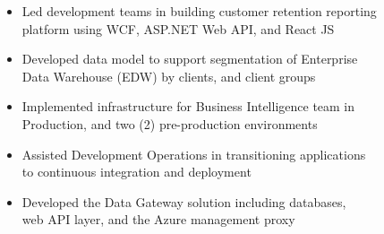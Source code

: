 
%


\ExperienceExpanded
{\begin{itemize}
     \item Led development teams in building customer retention reporting
     \\ platform using WCF, ASP.NET Web API, and React JS
     \item Developed data model to support segmentation of Enterprise
     \\ Data Warehouse (EDW) by clients, and client groups
     \item Implemented infrastructure for Business Intelligence team in
     \\ Production, and two (2) pre-production environments
     \item Assisted Development Operations in transitioning applications
     \\ to continuous integration and deployment
     \item Developed the Data Gateway solution including databases,
     \\ web API layer, and the Azure management proxy
\end{itemize}}


